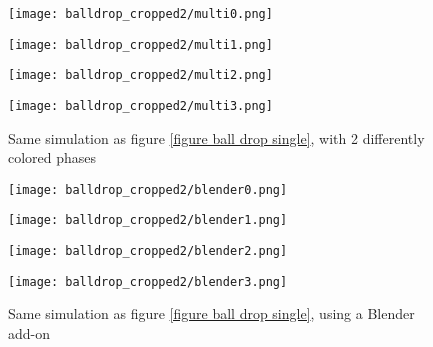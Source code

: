 \begin{figure}[H]
    \centering
    
    \begin{minipage}[t]{.42\linewidth}
        \centering
        \vspace{0pt}
        \texttt{[image: balldrop\_cropped2/multi0.png]}
    \end{minipage}
    \begin{minipage}[t]{.42\linewidth}
        \centering
        \vspace{0pt}
        \texttt{[image: balldrop\_cropped2/multi1.png]}
    \end{minipage}

    \vspace{0.5cm}

    \begin{minipage}[t]{.42\linewidth}
        \centering
        \vspace{0pt}
        \texttt{[image: balldrop\_cropped2/multi2.png]}
    \end{minipage}
    \begin{minipage}[t]{.42\linewidth}
        \centering
        \vspace{0pt}
        \texttt{[image: balldrop\_cropped2/multi3.png]}
    \end{minipage}

    \caption{Same simulation as figure \ref{figure ball drop single}, with 2 differently colored phases}
    \label{figure ball drop multi}
\end{figure}



\begin{figure}[H]
    \centering
    
    \begin{minipage}[t]{.42\linewidth}
        \centering
        \vspace{0pt}
        \texttt{[image: balldrop\_cropped2/blender0.png]}
    \end{minipage}
    \begin{minipage}[t]{.42\linewidth}
        \centering
        \vspace{0pt}
        \texttt{[image: balldrop\_cropped2/blender1.png]}
    \end{minipage}

    \vspace{0.5cm}

    \begin{minipage}[t]{.42\linewidth}
        \centering
        \vspace{0pt}
        \texttt{[image: balldrop\_cropped2/blender2.png]}
    \end{minipage}
    \begin{minipage}[t]{.42\linewidth}
        \centering
        \vspace{0pt}
        \texttt{[image: balldrop\_cropped2/blender3.png]}
    \end{minipage}

    \caption{Same simulation as figure \ref{figure ball drop single}, using a Blender add-on}
    \label{figure ball drop blender}
\end{figure}



